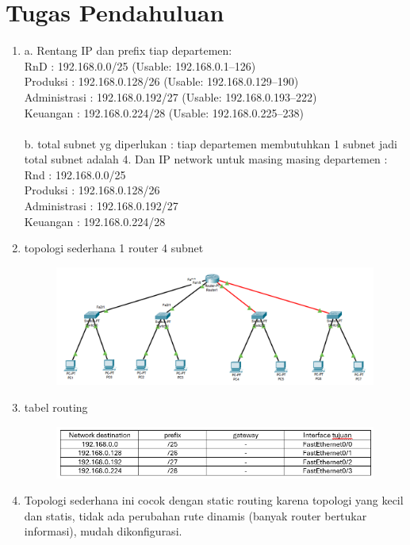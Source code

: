 \section{Tugas Pendahuluan}
\begin{enumerate}
	\item a. Rentang IP dan prefix tiap departemen: \\ RnD : 192.168.0.0/25 (Usable: 192.168.0.1–126) \\ Produksi : 192.168.0.128/26 (Usable: 192.168.0.129–190) \\ Administrasi : 192.168.0.192/27 (Usable: 192.168.0.193–222) \\ Keuangan : 192.168.0.224/28 (Usable: 192.168.0.225–238) \\ \\ b. total subnet yg diperlukan : tiap departemen membutuhkan 1 subnet jadi total subnet adalah 4. Dan IP network untuk masing masing departemen : \\ Rnd : 192.168.0.0/25 \\ Produksi : 192.168.0.128/26 \\ Administrasi : 192.168.0.192/27 \\ Keuangan : 192.168.0.224/28
	\item topologi sederhana 1 router 4 subnet
	\begin{figure}[H]
		\centering
		\includegraphics[width=0.65\linewidth]{image/Topologi sederhana.png}
		\label{fig:inirujukan}
	\end{figure}	
	\item tabel routing
	\begin{figure}[H]
		\centering
		\includegraphics[width=0.8\linewidth]{image/tabel routing.png}
		\label{fig:inirujukan}
	\end{figure}
	\item Topologi sederhana ini cocok dengan static routing karena topologi yang kecil dan statis, tidak ada perubahan rute dinamis (banyak router bertukar informasi), mudah dikonfigurasi. 
\end{enumerate}